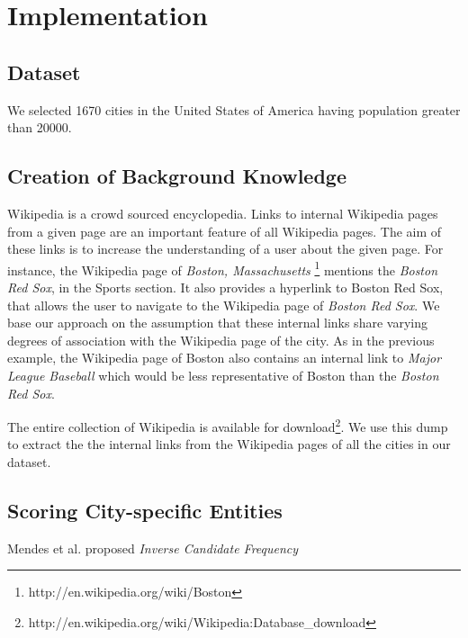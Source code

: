  
\section{Implementation}
\label{sec:implementation}

\subsection{Dataset}
We selected 1670 cities in the United States of America having population greater than 20000.

\subsection{Creation of Background Knowledge}
Wikipedia is a crowd sourced encyclopedia. Links to internal Wikipedia pages from a given page are an important feature of all Wikipedia pages. The aim of these links is to increase the understanding of a user about the given page. For instance, the Wikipedia page of \textit{Boston, Massachusetts} \footnote{http://en.wikipedia.org/wiki/Boston} mentions the \textit{Boston Red Sox}, in the Sports section. It also provides a hyperlink to Boston Red Sox, that allows the user to navigate to the Wikipedia page of \textit{Boston Red Sox}. We base our approach on the assumption that these internal links share varying degrees of association with the Wikipedia page of the city. As in the previous example, the Wikipedia page of Boston also contains an internal link to \textit{Major League Baseball} which would be less representative of Boston than the \textit{Boston Red Sox}. 

The entire collection of Wikipedia is available for download\footnote{http://en.wikipedia.org/wiki/Wikipedia:Database\_download}. We use this dump to extract the 
the internal links from the Wikipedia pages of all the cities in our dataset.

\subsection{Scoring City-specific Entities}


Mendes et al. \cite{mendes2011dbpedia} proposed \textit{Inverse Candidate Frequency} 
